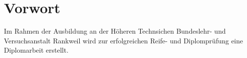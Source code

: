 \chapter*{Vorwort}
\label{chap:Vorwort}
Im Rahmen der Ausbildung an der Höheren Technsichen Bundeslehr- und Versuchsanstalt Rankweil wird zur erfolgreichen Reife- und Diplomprüfung eine Diplomarbeit erstellt.